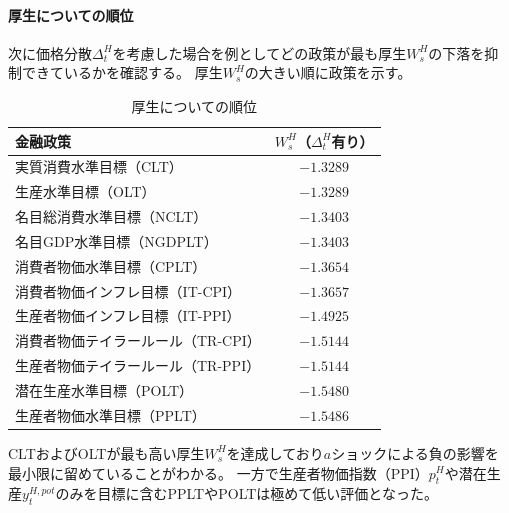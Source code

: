 
\paragraph{厚生についての順位}
\label{sec:chapter5_a_shock_welfare}
次に価格分散\(\Delta_t^H\)を考慮した場合を例としてどの政策が最も厚生\(W_s^H\)の下落を抑制できているかを確認する。
厚生\(W_s^H\)の大きい順に政策を示す。
\begin{table}[H]
\centering
\caption{厚生についての順位}
\label{tab:chapter5_a_shock_welfare}
\begin{tabular}{lc}
\hline
金融政策 & \(W_s^H\)（\(\Delta_t^H\)有り） \\
\hline
実質消費水準目標（CLT） & $-1.3289$ \\
生産水準目標（OLT） & $-1.3289$ \\
名目総消費水準目標（NCLT） & $-1.3403$ \\
名目GDP水準目標（NGDPLT） & $-1.3403$ \\
消費者物価水準目標（CPLT） & $-1.3654$ \\
消費者物価インフレ目標（IT-CPI） & $-1.3657$ \\
生産者物価インフレ目標（IT-PPI） & $-1.4925$ \\
消費者物価テイラールール（TR-CPI） & $-1.5144$ \\
生産者物価テイラールール（TR-PPI） & $-1.5144$ \\
潜在生産水準目標（POLT） & $-1.5480$ \\
生産者物価水準目標（PPLT） & $-1.5486$ \\
\hline
\end{tabular}
\end{table}
CLTおよびOLTが最も高い厚生\(W_s^H\)を達成しており\(a\)ショックによる負の影響を最小限に留めていることがわかる。
一方で生産者物価指数（PPI）\(p_t^H\)や潜在生産\(y_t^{H,pot}\)のみを目標に含むPPLTやPOLTは極めて低い評価となった。